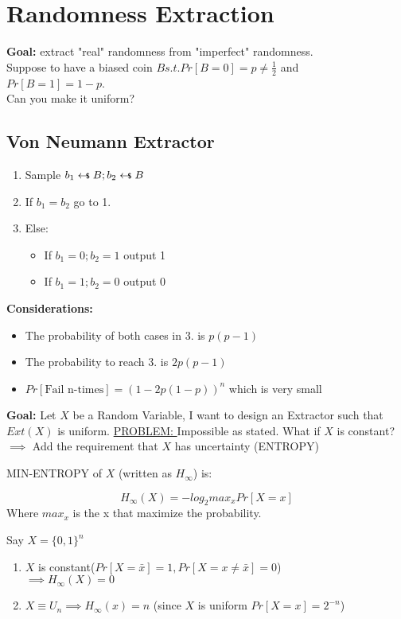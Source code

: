 
\section{Randomness Extraction}
\textbf{Goal:} extract "real" randomness from "imperfect" randomness.\\

\bigskip
Suppose to have a biased coin $B s.t. Pr[B=0]=p\neq \frac{1}{2}$ and\\ $Pr[B=1]=1-p$.\\
Can you make it uniform?

\subsection{Von Neumann Extractor}
\begin{enumerate}
    \item Sample $b_1\pickUAR B; b_2\pickUAR B$
    \item If $b_1=b_2$ go to 1.
    \item Else:
    \begin{itemize}
        \item If $b_1=0;b_2=1$ output 1
        \item If $b_1=1;b_2=0$ output 0 
    \end{itemize}
\end{enumerate}
\textbf{Considerations: }
\begin{itemize}
    \item The probability of both cases in 3. is $p(p-1)$
    \item The probability to reach 3. is $2p(p-1)$
    \item $Pr[\text{Fail n-times}]=(1-2p(1-p))^n$ which is very small
\end{itemize}

\textbf{Goal: } Let $X$ be a Random Variable, I want to design an Extractor such that $Ext(X)$ is uniform.
\underline{PROBLEM: } Impossible as stated. What if $X$ is constant? $\implies$ Add the requirement that $X$ has uncertainty (ENTROPY)

\begin{definition}
    MIN-ENTROPY of $X$ (written as $H_{\infty}$) is:

    $$H_{\infty}(X)=-log_2 max_x Pr[X=x]$$
    Where $max_x$ is the x that maximize the probability.
\end{definition}
\begin{example}
    Say $X=\{0,1\}^n$\\
    \begin{enumerate}
        \item $X$ is constant($Pr[X=\bar{x}]=1, Pr[X=x\neq \bar{x}]=0$)\\
        $\implies H_{\infty}(X)=0$
        \item $X\equiv U_n \implies H_{\infty}(x)=n$ (since $X$ is uniform $Pr[X=x]=2^{-n}$)   
    \end{enumerate}
\end{example}


